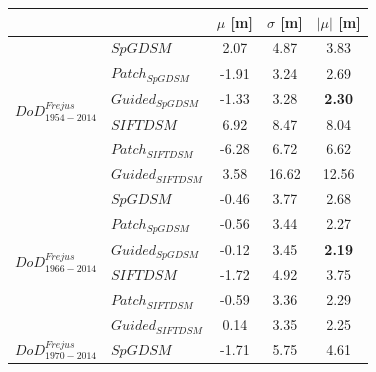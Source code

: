 \begin{table}%
	\footnotesize
	\centering
	\begin{tabular}{||l|l|c|c|c||}\hline
		& &$\mu$ [m]&$\sigma$ [m]&$|\mu|$ [m]\\\hline\hline
		\multirow{6}{*}{$DoD^{Frejus}_{1954-2014}$}
		&${{SpGDSM}}$ & 2.07 & 4.87 & {3.83} \\
		&${Patch_{SpGDSM}}$ & -1.91 & 3.24 & 2.69\\
		&${Guided_{SpGDSM}}$ & -1.33 & 3.28 & \textbf{2.30}\\
		&${{SIFTDSM}}$ & 6.92 & 8.47 & 8.04\\
		&${Patch_{SIFTDSM}}$ & -6.28 & 6.72 & 6.62\\
		&${Guided_{SIFTDSM}}$ & 3.58 & 16.62 & 12.56\\\hline
		\multirow{6}{*}{$DoD^{Frejus}_{1966-2014}$}
		&${{SpGDSM}}$ & -0.46 & 3.77 & {2.68}\\
		&${Patch_{SpGDSM}}$ & -0.56 & 3.44 & 2.27\\
		&${Guided_{SpGDSM}}$ & -0.12 & 3.45 & \textbf{2.19}\\
		&${{SIFTDSM}}$ & -1.72 & 4.92 & 3.75\\
		&${Patch_{SIFTDSM}}$ & -0.59 & 3.36 & 2.29\\
		&${Guided_{SIFTDSM}}$ & 0.14 & 3.35 & 2.25\\\hline
		\multirow{6}{*}{$DoD^{Frejus}_{1970-2014}$}
		&${{SpGDSM}}$ & -1.71 & 5.75 & 4.61\\

\end{tabular}
\end{table}
